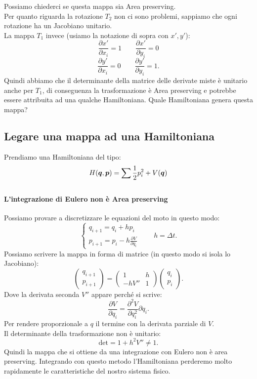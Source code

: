 \noindent
Possiamo chiederci se questa mappa sia Area preserving. \\
Per quanto riguarda la rotazione $T_2$ non ci sono problemi, sappiamo che ogni rotazione ha un Jacobiano unitario. \\
La mappa $T_1$ invece (usiamo la notazione di sopra con $x', y'$):
\[
    \frac{\partial x'}{\partial x_i} = 1 \qquad \frac{\partial x'}{\partial y_{i}} = 0
\] 
\[
    \frac{\partial y'}{\partial x_i} = 0  \qquad  \frac{\partial y'}{\partial y_{i}} = 1
.\] 
Quindi abbiamo che il determinante della matrice delle derivate miste è unitario anche per $T_1$, di conseguenza la trasformazione è Area preserving e potrebbe essere attribuita ad una qualche Hamiltoniana. Quale Hamiltoniana genera questa mappa?
\subsection{Legare una mappa ad una Hamiltoniana}%
\label{sub:Legare una mappa ad una Hamiltoniana}
Prendiamo una Hamiltoniana del tipo:
\begin{equation}
    H(\boldsymbol{q}, \boldsymbol{p})=\sum_{}^{} \frac{1}{2}p_i^2 + V(\boldsymbol{q})
    \label{eq:19_H}
\end{equation}
\paragraph{L'integrazione di Eulero non è Area preserving}%
\label{par:Integrazione di Eulero}
Possiamo provare a discretizzare le equazioni del moto in questo modo:
\[
    \begin{cases}
        q_{i+1}=q_i + hp_i\\
	p_{i+1}=p_i - h \frac{\partial V}{\partial q_i} 
    \end{cases}
    \qquad
    h = \Delta t
.\] 
Possiamo scrivere la mappa in forma di matrice (in questo modo si isola lo Jacobiano):
\[
    \begin{pmatrix} q_{i+1}\\ p_{i+1} \end{pmatrix} =
    \begin{pmatrix} 
	1      & h \\
	- hV'' & 1
    \end{pmatrix} 
    \begin{pmatrix} q_i \\p_i \end{pmatrix}
.\] 
Dove la derivata seconda $V''$ appare perché si scrive:
\[
    \frac{\partial V}{\partial q_i} = \frac{\partial ^2V}{\partial q_i^2} \partial q_i
.\] 
Per rendere proporzionale a $q$ il termine con la derivata parziale di $V$. \\
Il determinante della trasformazione non è unitario:
\[
    \text{det} = 1 + h^2V'' \neq 1
.\] 
Quindi la mappa che si ottiene da una integrazione con Eulero non è area preserving. Integrando con questo metodo l'Hamiltoniana perderemo molto rapidamente le caratteristiche del nostro sistema fisico.

